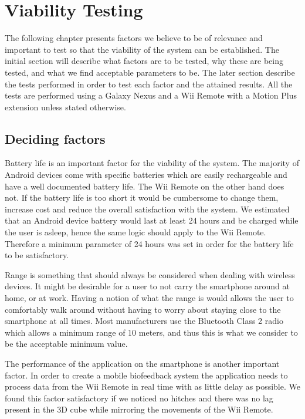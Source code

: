 \chapter{Viability Testing}
The following chapter presents factors we believe to be of relevance and important to test so that the viability of the system can be established. The initial section will describe what factors are to be tested, why these are being tested, and what we find acceptable parameters to be. The later section describe the tests performed in order to test each factor and the attained results. All the tests are performed using a Galaxy Nexus \cite{galaxyNexus} and a Wii Remote with a Motion Plus extension unless stated otherwise.

\section{Deciding factors}
Battery life is an important factor for the viability of the system. The majority of Android devices come with specific batteries which are easily rechargeable and have a well documented battery life. The Wii Remote on the other hand does not. If the battery life is too short it would be cumbersome to change them, increase cost and reduce the overall satisfaction with the system. We estimated that an Android device battery would last at least 24 hours and be charged while the user is asleep, hence the same logic should apply to the Wii Remote. Therefore a minimum parameter of 24 hours was set in order for the battery life to be satisfactory.

Range is something that should always be considered when dealing with wireless devices. It might be desirable for a user to not carry the smartphone around at home, or at work. Having a notion of what the range is would allows the user to comfortably walk around without having to worry about staying close to the smartphone at all times. Most manufacturers use the Bluetooth Class 2 radio which allows a minimum range of 10 meters, and thus this is what we consider to be the acceptable minimum value.

The performance of the application on the smartphone is another important factor. In order to create a mobile biofeedback system the application needs to process data from the Wii Remote in real time with as little delay as possible. We found this factor satisfactory if we noticed no hitches and there was no lag present in the 3D cube while mirroring the movements of the Wii Remote.

